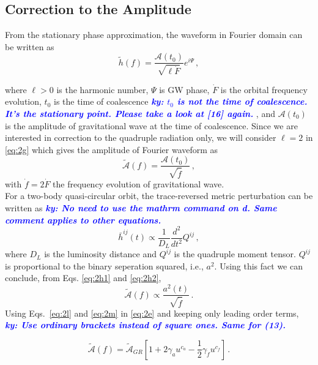 \documentclass[11pt]{article}
\newcommand{\ky}[1]{\textcolor{blue}{\it{\textbf{ky: #1}}} }
\begin{document}
 \subsection{Correction to the Amplitude}
 
 \hspace{15.5pt}From the stationary phase approximation\cite{Yunes:2009yz}\cite{PhysRevD.62.084036}, the waveform in Fourier domain can be written as
 \begin{equation}\label{eq:2g}
 \tilde{h}(f)=\frac{\mathcal{A}(t_0)}{\sqrt{\ell \dot{F}}}e^{i\Psi}\,,
 \end{equation}
 
where $\ell >0$ is the harmonic number, $\Psi$ is GW phase, $\dot{F}$ is the orbital frequency evolution, $t_0$ is the time of coalescence \ky{$t_0$ is not the time of coalescence. It's the stationary point. Please take a look at [16] again.}, and $\mathcal{A}(t_0)$ is the amplitude of gravitational wave at the time of coalescence. Since we are interested in correction to the quadruple radiation only, we will consider $\ell =2$ in \eqref{eq:2g} which gives the amplitude of Fourier waveform as
\begin{equation}\label{eq:2h1}
\tilde{\mathcal{A}}(f)=\frac{\mathcal{A}(t_0)}{\sqrt{\dot{f}}}\,,
\end{equation}
with $\dot{f}=2\dot{F}$ the frequency evolution of gravitational wave.\\
\hspace{15.5pt}For a two-body quasi-circular orbit, the trace-reversed metric perturbation can be written as \cite{Blanchet:2002av} \ky{No need to use the mathrm command on d. Same comment applies to other equations.}
 \begin{equation}\label{eq:2h2}
\bar{h}^{ij}(t)\propto \frac{1}{D_L}\frac{d^2}{d t^2}Q^{ij}\,,
 \end{equation}
 where $D_L$ is the luminosity distance and $Q^{ij}$ is the quadruple moment tensor. $Q^{ij}$ is proportional to the binary seperation squared, i.e., $a^2$. Using this fact we can conclude, from Eqs. \eqref{eq:2h1} and \eqref{eq:2h2},
\begin{equation}\label{eq:2e}
\tilde{\mathcal{A}}(f)\propto \frac{a^2(t)}{\sqrt{\dot{f}}}\,.
\end{equation}
Using Eqs.~\eqref{eq:2l} and \eqref{eq:2m} in \eqref{eq:2e} and keeping only leading order terms,  \ky{Use ordinary brackets instead of square ones. Same for (13).}

\begin{equation}\label{eq:2n}
\tilde{\mathcal{A}}(f)=\tilde{\mathcal{A}}_{GR} \left[1+2\gamma_au^{c_a}-\frac{1}{2}\gamma_{\dot{f}}u^{c_{\dot{f}}}\right]\,.
\end{equation}
\end{document}
